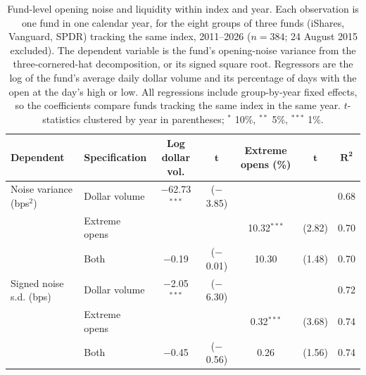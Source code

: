 \begin{table}[H]
\caption{Fund-level opening noise and liquidity within index and year. Each observation is one fund in one calendar year, for the eight groups of three funds (iShares, Vanguard, SPDR) tracking the same index, 2011--2026 ($n = 384$; 24 August 2015 excluded). The dependent variable is the fund's opening-noise variance from the three-cornered-hat decomposition, or its signed square root. Regressors are the log of the fund's average daily dollar volume and its percentage of days with the open at the day's high or low. All regressions include group-by-year fixed effects, so the coefficients compare funds tracking the same index in the same year. $t$-statistics clustered by year in parentheses; $^{*}$ 10\%, $^{**}$ 5\%, $^{***}$ 1\%.\label{tab:fundliq}}
\centering
\small
\begin{tabularx}{\textwidth}{llCCCCC}
\toprule
\textbf{Dependent} & \textbf{Specification} & \textbf{Log dollar vol.} & $\boldsymbol{t}$ & \textbf{Extreme opens (\%)} & $\boldsymbol{t}$ & $\boldsymbol{R^2}$\\
\midrule
Noise variance (bps$^2$) & Dollar volume & $-$62.73$^{***}$ & ($-$3.85) &  &  & 0.68 \\
 & Extreme opens &  &  & 10.32$^{***}$ & (2.82) & 0.70 \\
 & Both & $-$0.19 & ($-$0.01) & 10.30 & (1.48) & 0.70 \\
\midrule
Signed noise s.d. (bps) & Dollar volume & $-$2.05$^{***}$ & ($-$6.30) &  &  & 0.72 \\
 & Extreme opens &  &  & 0.32$^{***}$ & (3.68) & 0.74 \\
 & Both & $-$0.45 & ($-$0.56) & 0.26 & (1.56) & 0.74 \\
\bottomrule
\end{tabularx}
\end{table}

